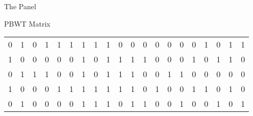 \documentclass{beamer}
\begin{document}
\begin{frame}{The Panel}
\begin{block}{PBWT Matrix}
\begin{table}[H]
\begin{tabular}{c|c|c|c|c|c|c|c|c|c|c|c|c|c|c|c|c|c|c|c}
        0 & 1 & 0 & 1 & 1 & 1 & 1 & 1 & 1 & 0 & 0 & 0 & 0 & 0 & 0 & 0 & 1 & 0
             & 1 & 1 \\
        1 & 0 & 0 & 0 & 0 & 0 & 1 & 0 & 1 & 1 & 1 & 1 & 0 & 0 & 0 & 1 & 0 & 1
             & 1 & 0 \\
        0 & 1 & 1 & 1 & 0 & 0 & 1 & 0 & 1 & 1 & 1 & 0 & 0 & 1 & 1 & 0 & 0 & 0
             & 0 & 0 \\
        1 & 0 & 0 & 0 & 1 & 1 & 1 & 1 & 1 & 1 & 1 & 0 & 1 & 0 & 0 & 1 & 1 & 0
             & 1 & 0 \\
        0 & 1 & 0 & 0 & 0 & 0 & 1 & 1 & 1 & 0 & 1 & 1 & 0 & 0 & 1 & 0 & 0 & 1
             & 0 & 1 \\
        \hline
      \end{tabular}
    \end{table}
  \end{block}
\end{frame}
\end{document}
